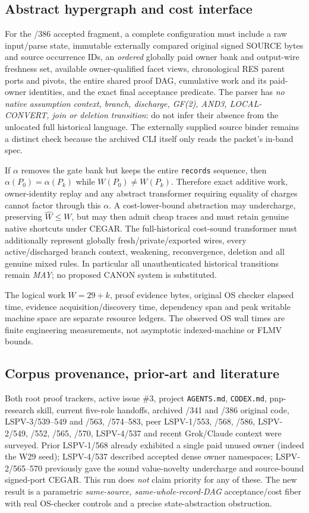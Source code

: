 \documentclass[11pt]{article}
\begin{document}
\subsection*{Abstract hypergraph and cost interface}
For the /386 accepted fragment, a complete configuration must include a raw input/parse state, immutable externally compared original signed SOURCE bytes and source occurrence IDs, an \emph{ordered} globally paid owner bank and output-wire freshness set, available owner-qualified facet views, chronological RES parent ports and pivots, the entire shared proof DAG, cumulative work and its paid-owner identities, and the exact final acceptance predicate. The parser has \emph{no native assumption context, branch, discharge, GF(2), AND3, LOCAL-CONVERT, join or deletion transition}: do not infer their absence from the unlocated full historical language. The externally supplied source binder remains a distinct check because the archived CLI itself only reads the packet's in-band spec.

If \(\alpha\) removes the gate bank but keeps the entire \texttt{records} sequence, then \(\alpha(P_0)=\alpha(P_k)\) while \(W(P_0)\ne W(P_k)\). Therefore exact additive work, owner-identity replay and any abstract transformer requiring equality of charges cannot factor through this \(\alpha\). A cost-lower-bound abstraction may undercharge, preserving \(\widehat W\le W\), but may then admit cheap traces and must retain genuine native shortcuts under CEGAR. The full-historical cost-sound transformer must additionally represent globally fresh/private/exported wires, every active/discharged branch context, weakening, reconvergence, deletion and all genuine mixed rules. In particular all unauthenticated historical transitions remain \emph{MAY}; no proposed CANON system is substituted.

The logical work \(W=29+k\), proof evidence bytes, original OS checker elapsed time, evidence acquisition/discovery time, dependency span and peak writable machine space are separate resource ledgers. The observed OS wall times are finite engineering measurements, not asymptotic indexed-machine or FLMV bounds.

\subsection*{Corpus provenance, prior-art and literature}
Both root proof trackers, active issue \#3, project \texttt{AGENTS.md}, \texttt{CODEX.md}, pnp-research skill, current five-role handoffs, archived /341 and /386 original code, LSPV-3/539--549 and /563, /574--583, peer LSPV-1/553, /568, /586, LSPV-2/549, /552, /565, /570, LSPV-4/537 and recent Grok/Claude context were surveyed. Prior LSPV-1/568 already exhibited a single paid unused owner (indeed the W29 seed); LSPV-4/537 described accepted dense owner namespaces; LSPV-2/565--570 previously gave the sound value-novelty undercharge and source-bound signed-port CEGAR. This run does \emph{not} claim priority for any of these. The new result is a parametric \emph{same-source, same-whole-record-DAG} acceptance/cost fiber with real OS-checker controls and a precise state-abstraction obstruction.
\end{document}
